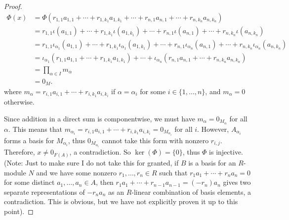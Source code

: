 \documentclass[10pt]{article}
\begin{document}
\begin{enumerate}
\begin{proof}
\begin{align*}
\Phi(x) &= \Phi(r_{1,1}a_{1,1} + \cdots + r_{1,k_1}a_{1,k_1} + \cdots + r_{n,1}a_{n,1} + \cdots + r_{n,k_n}a_{n,k_n})
\\
&=
r_{1,1}\iota(a_{1,1}) + \cdots + r_{1,k_1}\iota(a_{1,k_1}) + \cdots + r_{n,1}\iota(a_{n,1}) + \cdots + r_{n,k_n}\iota(a_{n,k_n})
\\
&=
r_{1,1}\iota_{\alpha_1}(a_{1,1}) + \cdots + r_{1,k_1}\iota_{\alpha_1}(a_{1,k_1}) + \cdots + r_{n,1}\iota_{\alpha_n}(a_{n,1}) + \cdots + r_{n,k_n}\iota_{\alpha_n}(a_{n,k_n})
\\
&=
\iota_{\alpha_1}(r_{1,1}a_{1,1} + \cdots + r_{1,k_1}a_{1,k_1}) + \cdots + \iota_{\alpha_n}(r_{n,1}a_{n,1} + \cdots + r_{n,k_n}a_{n,k_n})
\\
&= \prod_{\alpha \in I} m_\alpha
\\
&= 0_M.
\end{align*}
where $m_\alpha = r_{i,1}a_{i,1} + \cdots + r_{i,k_1}a_{i,k_i}$ if $\alpha = \alpha_i$ for some $i \in \{1, \dots , n \}$, and $m_\alpha = 0$ otherwise.

Since addition in a direct sum is componentwise, we must have $m_\alpha = 0_{M_\alpha}$ for all $\alpha$.  This means that $m_{\alpha_i} = r_{i,1}a_{i,1} + \cdots + r_{i,k_1}a_{i,k_i} = 0_{M_{\alpha_i}}$ for all $i$.  However, $A_{\alpha_i}$ forms a basis for $M_{\alpha_i}$, thus $0_{M_{\alpha_i}}$ cannot take this form with nonzero $r_{i,j}$.  Therefore, $x \neq 0_{F(A)}$, a contradiction.  So $\ker(\Phi) = \{0\}$, thus $\Phi$ is injective.
(Note:  Just to make sure I do not take this for granted, if $B$ is a basis for an $R$-module $N$ and we have some nonzero $r_1,\dots , r_n \in R$ such that $r_1a_1 + \cdots + r_na_n = 0$ for some distinct $a_1, \dots , a_n \in A$, then $r_1a_1 + \cdots + r_{n-1}a_{n-1} = (-r_n)a_n$ gives two separate representations of $-r_na_n$ as an $R$-linear combination of basis elements, a contradiction.  This is obvious, but we have not explicitly proven it up to this point).


\end{proof}
\end{enumerate}
\end{document}
